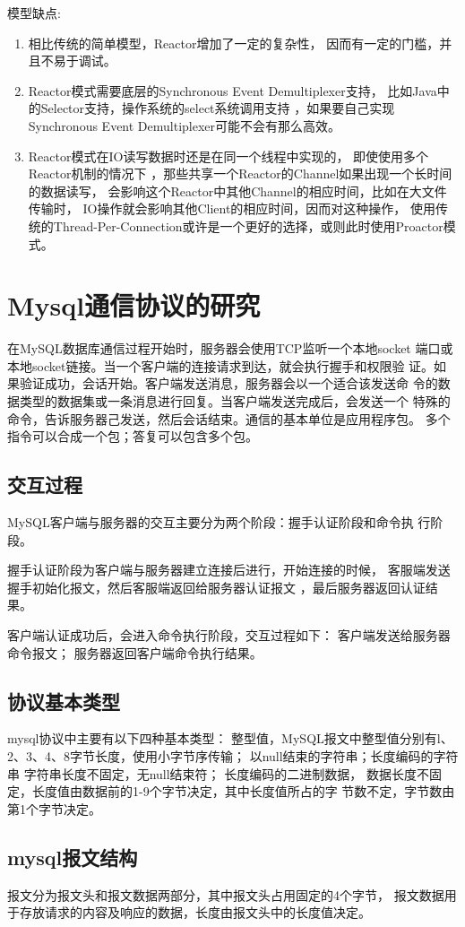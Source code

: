 \noindent
模型缺点:
\begin{enumerate}
	\item 相比传统的简单模型，Reactor增加了一定的复杂性，
	因而有一定的门槛，并且不易于调试。
	\item Reactor模式需要底层的Synchronous Event Demultiplexer支持，
	比如Java中的Selector支持，操作系统的select系统调用支持
	，如果要自己实现Synchronous Event Demultiplexer可能不会有那么高效。 
	\item Reactor模式在IO读写数据时还是在同一个线程中实现的，
	即使使用多个Reactor机制的情况下
	，那些共享一个Reactor的Channel如果出现一个长时间的数据读写，
	会影响这个Reactor中其他Channel的相应时间，比如在大文件传输时，
	IO操作就会影响其他Client的相应时间，因而对这种操作，
	使用传统的Thread-Per-Connection或许是一个更好的选择，或则此时使用Proactor模式。 
\end{enumerate}
\section{Mysql通信协议的研究}
在MySQL数据库通信过程开始时，服务器会使用TCP监听一个本地socket
端口或本地socket链接。当一个客户端的连接请求到达，就会执行握手和权限验
证。如果验证成功，会话开始。客户端发送消息，服务器会以一个适合该发送命
令的数据类型的数据集或一条消息进行回复。当客户端发送完成后，会发送一个
特殊的命令，告诉服务器己发送，然后会话结束。通信的基本单位是应用程序包。
多个指令可以合成一个包；答复可以包含多个包。
\subsection{交互过程}
MySQL客户端与服务器的交互主要分为两个阶段：握手认证阶段和命令执
行阶段。

握手认证阶段为客户端与服务器建立连接后进行，开始连接的时候，
客服端发送握手初始化报文，然后客服端返回给服务器认证报文
，最后服务器返回认证结果。

客户端认证成功后，会进入命令执行阶段，交互过程如下：
客户端发送给服务器命令报文；
服务器返回客户端命令执行结果。
\subsection{协议基本类型}
mysql协议中主要有以下四种基本类型：
整型值，MySQL报文中整型值分别有l、2、3、4、8字节长度，使用小字节序传输；
以null结束的字符串；长度编码的字符串
字符串长度不固定，无null结束符；
长度编码的二进制数据，
数据长度不固定，长度值由数据前的1-9个字节决定，其中长度值所占的字
节数不定，字节数由第1个字节决定。
\subsection{mysql报文结构}
报文分为报文头和报文数据两部分，其中报文头占用固定的4个字节，
报文数据用于存放请求的内容及响应的数据，长度由报文头中的长度值决定。
